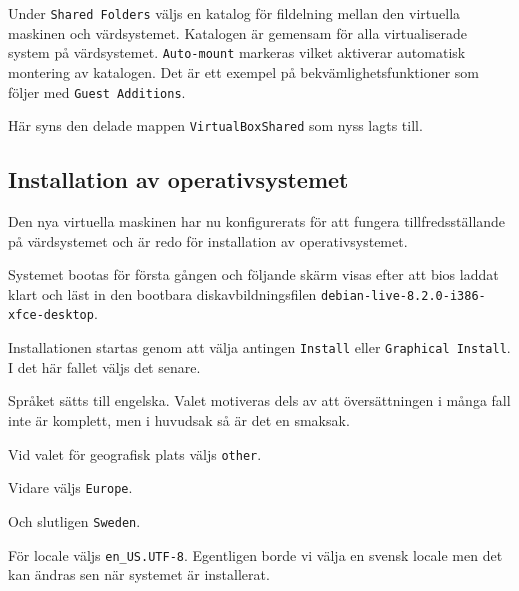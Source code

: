            {Under \texttt{Shared Folders} väljs en katalog för fildelning mellan den
            virtuella maskinen och värdsystemet. Katalogen är gemensam för alla
            virtualiserade system på värdsystemet. \texttt{Auto-mount} markeras vilket
            aktiverar automatisk montering av katalogen. Det är ett exempel på
            bekvämlighetsfunktioner som följer med \texttt{Guest Additions}.}
           {}
           {}

           {Här syns den delade mappen \texttt{VirtualBoxShared} som nyss lagts till.}
           {}
           {}

\subsection{Installation av operativsystemet}
Den nya virtuella maskinen har nu konfigurerats för att fungera
tillfredsställande på värdsystemet och är redo för installation av
operativsystemet.

           {Systemet bootas för första gången och följande skärm visas efter att
            bios laddat klart och läst in den bootbara diskavbildningsfilen
            \texttt{debian-live-8.2.0-i386-xfce-desktop}.}
           {}
           {}

           {Installationen startas genom att välja antingen \texttt{Install} eller
            \texttt{Graphical Install}. I det här fallet väljs det senare.}
           {}
           {}

           {Språket sätts till engelska. Valet motiveras dels av att
            översättningen i många fall inte är komplett, men i huvudsak så är
            det en smaksak.}
           {}
           {}

           {Vid valet för geografisk plats väljs \texttt{other}.}
           {}
           {}

           {Vidare väljs \texttt{Europe}.}
           {}
           {}

           {Och slutligen \texttt{Sweden}.}
           {}
           {}

           {För locale väljs \texttt{en_US.UTF-8}. Egentligen borde vi välja en
            svensk locale men det kan ändras sen när systemet är installerat.}
           {}
           {}

